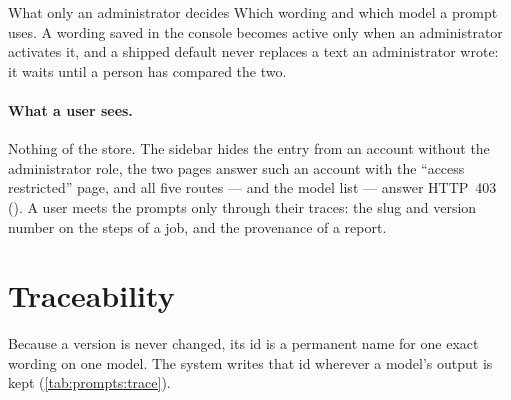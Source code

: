 \begin{humanbox}{What only an administrator decides}
Which wording and which model a prompt uses. A wording saved in the console becomes active only
when an administrator activates it, and a shipped default never replaces a text an
administrator wrote: it waits until a person has compared the two.
\end{humanbox}

\paragraph{What a user sees.} Nothing of the store. The sidebar hides the entry from an
account without the administrator role, the two pages answer such an account with the
\enquote{access restricted} page, and all five routes — and the model list — answer HTTP~403
 (). A user meets the prompts only through their
traces: the slug and version number on the steps of a job, and the provenance of a report.


\section{Traceability}\label{sec:prompts:trace}

Because a version is never changed, its id is a permanent name for one exact wording on one
model. The system writes that id wherever a model's output is kept
(\cref{tab:prompts:trace}).

